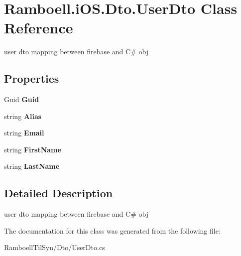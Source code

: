 \hypertarget{class_ramboell_1_1i_o_s_1_1_dto_1_1_user_dto}{}\section{Ramboell.\+i\+O\+S.\+Dto.\+User\+Dto Class Reference}
\label{class_ramboell_1_1i_o_s_1_1_dto_1_1_user_dto}


user dto mapping between firebase and C\# obj  


\subsection*{Properties}
\begin{DoxyCompactItemize}
\item 
\mbox{\label{class_ramboell_1_1i_o_s_1_1_dto_1_1_user_dto_a39547e77a125f074a699b46caba9b073}} 
Guid {\bfseries Guid}
\item 
\mbox{\label{class_ramboell_1_1i_o_s_1_1_dto_1_1_user_dto_a8383a0c3ec743643bbb0c0e808630d01}} 
string {\bfseries Alias}
\item 
\mbox{\label{class_ramboell_1_1i_o_s_1_1_dto_1_1_user_dto_a1099b55aca2d131c5e26a0ee1837dbbd}} 
string {\bfseries Email}
\item 
\mbox{\label{class_ramboell_1_1i_o_s_1_1_dto_1_1_user_dto_a110566e0230a60ea605769118608fa20}} 
string {\bfseries First\+Name}
\item 
\mbox{\label{class_ramboell_1_1i_o_s_1_1_dto_1_1_user_dto_af7484e3a655deffbf032db885a4890ee}} 
string {\bfseries Last\+Name}
\end{DoxyCompactItemize}


\subsection{Detailed Description}
user dto mapping between firebase and C\# obj 



The documentation for this class was generated from the following file\+:\begin{DoxyCompactItemize}
\item 
Ramboell\+Til\+Syn/\+Dto/User\+Dto.\+cs\end{DoxyCompactItemize}
